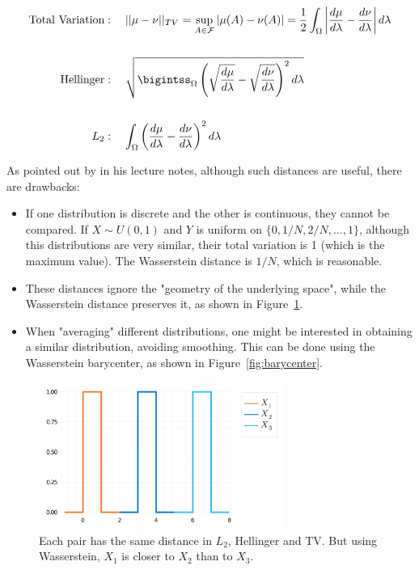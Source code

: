 \documentclass[10pt]{article}
\theoremstyle{definition}
\begin{document}
\begin{align*} 
\text{Total Variation} &: \quad || \mu - \nu ||_{TV} =
\sup_{A \in \mathcal F} |\mu (A) - \nu(A)| = 
\frac{1}{2}\int_\Omega \left | \frac{d\mu}{d\lambda} - \frac{d\nu}{d\lambda} \right
|d\lambda \\
\\
\text{Hellinger} &: \quad \sqrt{\bigintss_\Omega \left(\sqrt{\frac{d\mu}{d\lambda}} -
\sqrt{\frac{d\nu}{d\lambda}} \right )^2d\lambda} \\
\\
L_2 &: \quad \int_\Omega \left(\frac{d\mu}{d\lambda} - \frac{d\nu}{d\lambda}\right)^2
d\lambda \\
\end{align*}

As pointed out by \citet{wassermanStatisicalMethods2018} in his lecture notes,
although such distances are useful, there are drawbacks:
\begin{itemize}
	\item If one distribution is discrete and the other is continuous,  they cannot
	be compared. If $X \sim U(0,1)$ and $Y$ is uniform on $\{0,1/N, 2/N,...,1\}$,
	although this distributions are very similar, their total variation is 1 (which is
	the maximum value). The Wasserstein distance is $1/N$, which is reasonable.
	\item These distances ignore the "geometry of the underlying space", while the
	Wasserstein distance preserves it, as shown in Figure~\ref{fig:distances}.
	\item When "averaging" different distributions, one might be interested in obtaining
	a similar distribution, avoiding smoothing. This can be done using the Wasserstein
	barycenter, as shown in Figure~\ref{fig:barycenter}.
\end{itemize}
\begin{figure}[h]
	\centering
	\includegraphics[width=8cm]{images/Distributions_Distances.png}
    \caption{Each pair has the same distance in $L_2$, Hellinger and TV. But using
    Wasserstein, $X_1$ is closer to $X_2$ than to $X_3$.}
    \label{fig:distances}
\end{figure}
\end{document}
